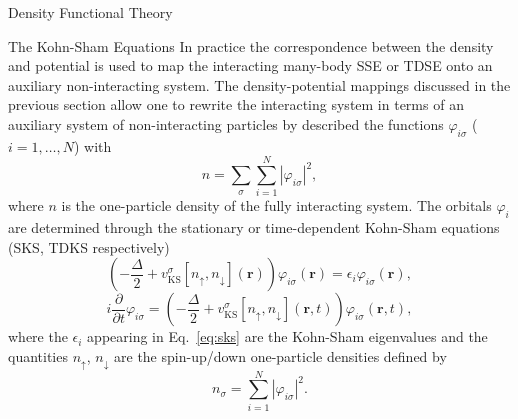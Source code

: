 \documentclass[letterpaper, 11 pt]{report}
\begin{document}
\begin{chapter}{Density Functional Theory \label{chap:dft}}
\begin{section}{The Kohn-Sham Equations \label{sec:ks}}
      In practice the correspondence between the density and potential is used to map the interacting
      many-body SSE or TDSE onto an auxiliary non-interacting system. The density-potential mappings
      discussed in the previous section allow one to rewrite the interacting system in terms of
      an auxiliary system of non-interacting particles by described the functions $\varphi_{i\sigma}$
      ($i = 1, \dots, N$) with
      \begin{equation} \label{eq:dendef2}
         n = \sum\limits_{\sigma} \sum\limits_{i = 1}^N
                           \left| \varphi_{i\sigma} \right|^2,
      \end{equation}
      where $n$ is the one-particle density of the fully interacting system. The orbitals $\varphi_i$ are
      determined through the stationary or time-dependent Kohn-Sham equations~\cite{ks-eq, spin-dep1,
      spin-dep3} (SKS, TDKS respectively)
      \begin{equation} \label{eq:sks}
         \left( -\frac{\Delta}{2} + v^\sigma_\mathrm{KS}[n_\uparrow, n_\downarrow](\mathbf{r}) \right)
          \varphi_{i\sigma}(\mathbf{r}) = \epsilon_i \varphi_{i \sigma}(\mathbf{r}),
      \end{equation}
      \begin{equation} \label{eq:tdks}
         i \frac{\partial}{\partial t} \varphi_{i\sigma} = 
            \left( -\frac{\Delta}{2} + v^\sigma_\mathrm{KS}[n_\uparrow, n_\downarrow](\mathbf{r},t)
            \right) \varphi_{i\sigma}(\mathbf{r},t),
      \end{equation}
      where the $\epsilon_i$ appearing in Eq.~\eqref{eq:sks} are the Kohn-Sham eigenvalues and the
      quantities $n_\uparrow$, $n_\downarrow$ are the spin-up/down one-particle densities defined by
      \begin{equation} \label{eq:spinden}
         n_\sigma = \sum\limits_{i=1}^{N} \left| \varphi_{i\sigma} \right|^2.
      \end{equation}


\end{section}
\end{chapter}
\end{document}
